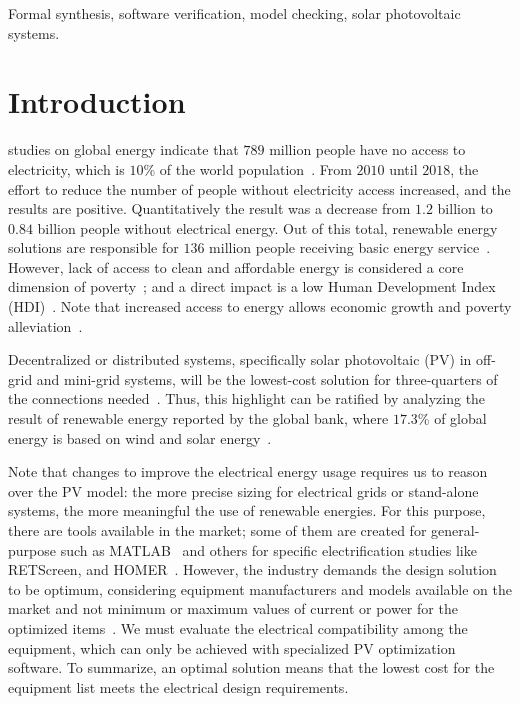 \documentclass[journal]{IEEEtran}
\begin{document}
\begin{IEEEkeywords}
Formal synthesis, software verification, model checking, solar photovoltaic systems.
\end{IEEEkeywords}
\IEEEpeerreviewmaketitle

\section{Introduction}
 studies on global energy indicate that $789$ million people have no access to electricity, which is $10$\% of the world population~\cite{Energyprogressreport}. From $2010$ until $2018$, the effort to reduce the number of people without electricity access increased, and the results are positive. Quantitatively the result was a decrease from $1.2$ billion to $0.84$ billion people without electrical energy. Out of this total, renewable energy solutions are responsible for $136$ million people receiving basic energy service~\cite{Energyprogressreport}. However, lack of access to clean and affordable energy is considered a core dimension of poverty~\cite{Hussein2012}; and a direct impact is a low Human Development Index (HDI)~\cite{Coelho}. Note that increased access to energy allows economic growth and poverty alleviation~\cite{Karekesi}. 
 
Decentralized or distributed systems, specifically solar photovoltaic (PV) in off-grid and mini-grid systems, will be the lowest-cost solution for three-quarters of the connections needed~\cite {Hussein2012}. Thus, this highlight can be ratified by analyzing the result of renewable energy reported by the global bank, where $17.3$\% of global energy is based on wind and solar energy~\cite{Energyprogressreport}. 

Note that changes to improve the electrical energy usage requires us to reason over the PV model: the more precise sizing for electrical grids or stand-alone systems, the more meaningful the use of renewable energies. For this purpose, there are tools available in the market; some of them are created for general-purpose such as MATLAB~\cite{Benatiallah2017} and others for specific electrification studies like RETScreen, and HOMER~\cite{Pradhan,Swarnkar}. However, the industry demands the design solution to be optimum, considering equipment manufacturers and models available on the market and not minimum or maximum values of current or power for the optimized items~\cite{DBLP:journals/corr/abs-1909-13139, Applasamy2011}. We must evaluate the electrical compatibility among the equipment, which can only be achieved with specialized PV optimization software. To summarize, an optimal solution means that the lowest cost for the equipment list meets the electrical design requirements.
 
\end{document}
